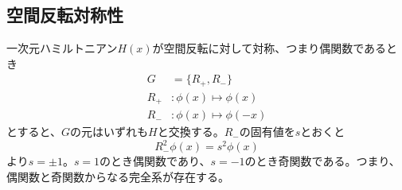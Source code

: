 \subsection{空間反転対称性}

    一次元ハミルトニアン$H(x)$が空間反転に対して対称、つまり偶関数であるとき
    \begin{align*}
        G &= \{R_+, R_-\}\\
        R_+&: \phi(x) \mapsto \phi(x)\\
        R_-&: \phi(x) \mapsto \phi(-x)
    \end{align*}
    とすると、$G$の元はいずれも$H$と交換する。$R_-$の固有値を$s$とおくと
        \[R_-^2\phi(x) = s^2\phi(x)\]
    より$s = \pm 1$。$s = 1$のとき偶関数であり、$s = -1$のとき奇関数である。つまり、偶関数と奇関数からなる完全系が存在する。

